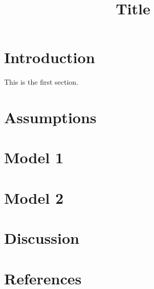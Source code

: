 \documentclass[12pt]{article}
\begin{document}
\title{Title}
\date{}
\maketitle
\thispagestyle{fancy}

\newpage

\renewcommand{\contentsname}{Table of Contents}
\tableofcontents
\thispagestyle{empty}

\newpage


\section{Introduction}

This is the first section.


\blindtext

\section{Assumptions}

\blindtext

\section{Model 1}

\blindtext

\section{Model 2}

\blindtext

\section{Discussion}

\blindtext

\section{References}
\printbibliography[heading=none]

\blindtext
\end{document}
